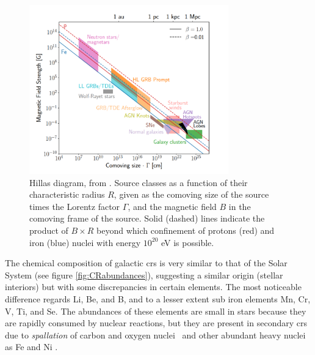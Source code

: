 \documentclass[main.tex]{subfiles}
\begin{document}
       \begin{figure}[h]
        \centering
        \includegraphics[width=0.77\textwidth]{Pictures/hillasdiagram.pdf}
        \caption{Hillas diagram, from \cite{2019openquestionsUHECR}. 
Source classes as a function of their characteristic radius $R$, given as the comoving size of the source times the Lorentz factor $\Gamma$, and the magnetic field $B$ in the comoving frame of the source. Solid (dashed) lines indicate the product of $B \times R$ beyond which confinement of protons (red) and iron (blue) nuclei with energy $10^{20}$ eV is possible.}
        \label{fig:hillasdiag}
    \end{figure}
    
    The chemical composition of galactic \glspl{cr} is very similar to that of the Solar System (see figure \ref{fig:CRabundances}), suggesting a similar origin (stellar interiors) but with some discrepancies in certain elements. The most noticeable difference regards Li, Be, and B, and to a lesser extent sub iron elements Mn, Cr, V, Ti, and Se. The abundances of these elements are small in stars because they are rapidly consumed by nuclear reactions, but they are present in secondary \glspl{cr} due to \textit{spallation} of carbon and oxygen nuclei~\cite{particleastrophy} and other abundant heavy nuclei as Fe and Ni \cite{2018particleacceleration}.
    
\end{document}
